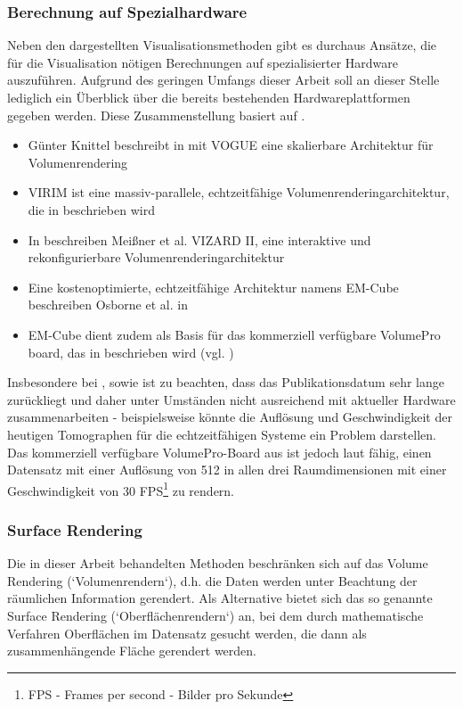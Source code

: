 \documentclass[a4paper,titlepage,12pt]{scrartcl}
\newtheorem[L]{boxedDefinition}{Definition}
\begin{document}
\subsubsection{Berechnung auf Spezialhardware}
Neben den dargestellten Visualisationsmethoden gibt es durchaus Ansätze, die für die Visualisation nötigen Berechnungen auf spezialisierter Hardware auszuführen. Aufgrund des geringen Umfangs dieser Arbeit soll an dieser Stelle lediglich ein Überblick über die bereits bestehenden Hardwareplattformen gegeben werden. Diese Zusammenstellung basiert auf \cite[Kapitel 2.5.5, Seite 14]{Bruckner2004}.
\begin{itemize}
 \item Günter Knittel beschreibt in \cite{Knittel1995} mit VOGUE eine skalierbare Architektur für Volumenrendering
 \item VIRIM ist eine massiv-parallele, echtzeitfähige Volumenrenderingarchitektur, die in \cite{Guenther1995} beschrieben wird
 \item In \cite{Meissner2002} beschreiben Meißner et al. VIZARD II, eine interaktive und rekonfigurierbare Volumenrenderingarchitektur
 \item Eine kostenoptimierte, echtzeitfähige Architektur namens EM-Cube beschreiben Osborne et al. in \cite{Osborne1997}
 \item EM-Cube dient zudem als Basis für das kommerziell verfügbare VolumePro board, das in \cite{Pfister1999} beschrieben wird (vgl. \cite[Kapitel 2.2.5, Seite 14]{Bruckner2004})
\end{itemize}
Insbesondere bei \cite{Knittel1995}, \cite{Guenther1995} sowie \cite{Osborne1997} ist zu beachten, dass das Publikationsdatum sehr lange zurückliegt und daher unter Umständen nicht ausreichend mit aktueller Hardware zusammenarbeiten - beispielsweise könnte die Auflösung und Geschwindigkeit der heutigen Tomographen für die echtzeitfähigen Systeme ein Problem darstellen. Das kommerziell verfügbare VolumePro-Board aus \cite{Pfister1999} ist jedoch laut \cite[Kapitel 2.2.5, Seite 14]{Bruckner2004} fähig, einen Datensatz mit einer Auflösung von 512 in allen drei Raumdimensionen mit einer Geschwindigkeit von 30 FPS\footnote{FPS - Frames per second - Bilder pro Sekunde} zu rendern.
\subsubsection{Surface Rendering}
Die in dieser Arbeit behandelten Methoden beschränken sich auf das Volume Rendering (`Volumenrendern`), d.h. die Daten werden unter Beachtung der räumlichen Information gerendert. Als Alternative bietet sich das so genannte Surface Rendering (`Oberflächenrendern`) an, bei dem durch mathematische Verfahren Oberflächen im Datensatz gesucht werden, die dann als zusammenhängende Fläche gerendert werden. 
\end{document}
